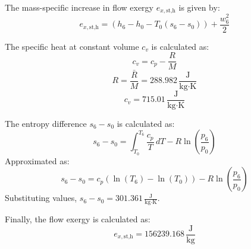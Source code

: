 The mass-specific increase in flow exergy \( e_{x,\text{st,h}} \) is given by:  
\[
e_{x,\text{st,h}} = (h_6 - h_0 - T_0 (s_6 - s_0)) + \frac{w_6^2}{2}
\]  

The specific heat at constant volume \( c_v \) is calculated as:  
\[
c_v = c_p - \frac{R}{M}
\]  
\[
R = \frac{\bar{R}}{M} = 288.982 \, \frac{\text{J}}{\text{kg·K}}
\]  
\[
c_v = 715.01 \, \frac{\text{J}}{\text{kg·K}}
\]

The entropy difference \( s_6 - s_0 \) is calculated as:  
\[
s_6 - s_0 = \int_{T_0}^{T_6} \frac{c_p}{T} \, dT - R \ln \left( \frac{p_6}{p_0} \right)
\]  
Approximated as:  
\[
s_6 - s_0 = c_p (\ln(T_6) - \ln(T_0)) - R \ln \left( \frac{p_6}{p_0} \right)
\]  
Substituting values, \( s_6 - s_0 = 301.361 \, \frac{\text{J}}{\text{kg·K}} \).

Finally, the flow exergy is calculated as:  
\[
e_{x,\text{st,h}} = 156239.168 \, \frac{\text{J}}{\text{kg}}
\]
